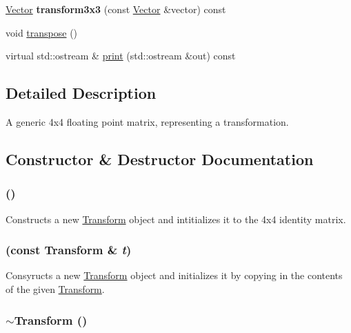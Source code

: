 \begin{CompactItemize}
\item 
\hypertarget{classm3g_1_1Transform_a8e4316680257437453501e30518a418}{
\hyperlink{classm3g_1_1Vector}{Vector} \textbf{transform3x3} (const \hyperlink{classm3g_1_1Vector}{Vector} \&vector) const }
\label{classm3g_1_1Transform_a8e4316680257437453501e30518a418}

\item 
void \hyperlink{classm3g_1_1Transform_f3a99ffb20127be48232d12260e934dc}{transpose} ()
\item 
virtual std::ostream \& \hyperlink{classm3g_1_1Transform_6fea17fa1532df3794f8cb39cb4f911f}{print} (std::ostream \&out) const 
\end{CompactItemize}


\subsection{Detailed Description}
A generic 4x4 floating point matrix, representing a transformation. 

\subsection{Constructor \& Destructor Documentation}
\hypertarget{classm3g_1_1Transform_9de68ec1c9b7809129814a3233ae4655}{
\subsubsection[{Transform}]{ ()}}
\label{classm3g_1_1Transform_9de68ec1c9b7809129814a3233ae4655}


Constructs a new \hyperlink{classm3g_1_1Transform}{Transform} object and intitializes it to the 4x4 identity matrix. \hypertarget{classm3g_1_1Transform_6f8c18ec2bd6b5c0d7f3472752ec79d1}{
\subsubsection[{Transform}]{ (const {\bf Transform} \& {\em t})}}
\label{classm3g_1_1Transform_6f8c18ec2bd6b5c0d7f3472752ec79d1}


Consyructs a new \hyperlink{classm3g_1_1Transform}{Transform} object and initializes it by copying in the contents of the given \hyperlink{classm3g_1_1Transform}{Transform}. \hypertarget{classm3g_1_1Transform_8e627263611a76aad02c9e0b89287c68}{
\subsubsection[{$\sim$Transform}]{\setlength{\rightskip}{0pt plus 5cm}$\sim${\bf Transform} ()}}
\label{classm3g_1_1Transform_8e627263611a76aad02c9e0b89287c68}


